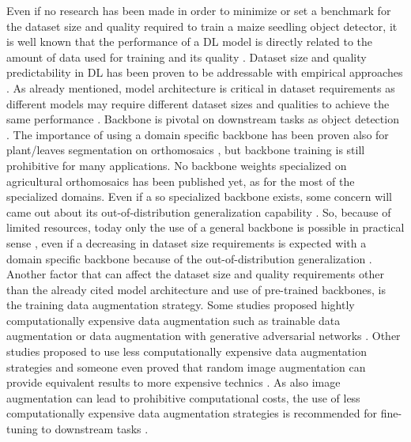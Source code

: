 \documentclass{article}
\begin{document}
Even if no research has been made in order to minimize or set a benchmark for the dataset size and quality
required to train a maize seedling object detector,
it is well known that the performance of a DL model is directly related to the
amount of data used for training \cite{sunRevisitingUnreasonableEffectiveness2017} and 
its quality \cite{alhazmiEffectsAnnotationQuality2021}.
Dataset size and quality predictability in DL has been proven to be
addressable with empirical approaches \cite{hestnessDeepLearningScaling2017,mahmoodHowMuchMore2022}.
As already mentioned, model architecture is critical in dataset requirements as different models may require
different dataset sizes and qualities to achieve the same performance \cite{nguyenEvaluationDeepLearning2020,brigatoCloseLookDeep2020}.
Backbone is pivotal on downstream tasks as object detection \cite{duSpineNetLearningScalePermuted2020}. 
The importance of using a domain specific backbone has been proven also
for plant/leaves segmentation on orthomosaics \cite{roggiolaniDomainSpecificPreTraining2023},
but backbone training is still prohibitive for many applications.
No backbone weights specialized on agricultural orthomosaics has been published yet,
as for the most of the specialized domains. Even if a so specialized backbone exists,
some concern will came out about its out-of-distribution generalization capability \cite{hendrycksManyFacesRobustness2020}.
So, because of limited resources, today only the use of a general backbone is 
possible in practical sense \cite{jeevanWhichBackboneUse2024},
even if a decreasing in dataset size requirements is expected with a domain specific 
backbone because of the out-of-distribution generalization \cite{goldblumBattleBackbonesLargeScale2023}.
Another factor that can affect the dataset size and quality requirements other than 
the already cited model architecture and use of pre-trained backbones, is the training data
augmentation strategy. Some studies proposed hightly computationally expensive data augmentation
such as trainable data augmentation \cite{cubukAutoAugmentLearningAugmentation2019} or
data augmentation with generative adversarial networks \cite{antoniouDataAugmentationGenerative2018}.
Other studies proposed to use less computationally expensive data augmentation strategies
\cite{shortenSurveyImageData2019,chadebecDataAugmentationVariational2021} and someone
even proved that random image augmentation can provide equivalent results to more
expensive technics \cite{mullerTrivialAugmentTuningfreeStateoftheArt2021}.
As also image augmentation can lead to prohibitive computational costs, the use of
less computationally expensive data augmentation strategies is recommended for
fine-tuning to downstream tasks \cite{shortenSurveyImageData2019}.
\end{document}
